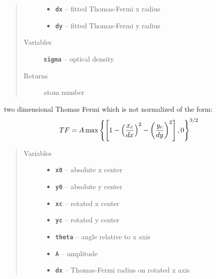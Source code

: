 \documentclass[letterpaper,10pt,english]{sphinxmanual}
\begin{document}
\begin{fulllineitems}
\begin{fulllineitems}
\begin{quote}
\begin{description}
\begin{itemize}
\item {} 
\textbf{\texttt{dx}} -- fitted Thomas-Fermi x radius

\item {} 
\textbf{\texttt{dy}} -- fitted Thomas-Fermi y radius

\end{itemize}

\item[{Variables}] \leavevmode
\textbf{\texttt{sigma}} -- optical density

\item[{Returns}] \leavevmode
atom number

\end{description}\end{quote}

\end{fulllineitems}


\begin{fulllineitems}
\label{fit_object:Fitobject.fit_object.TF_2D}
two dimensional Thomas Fermi which is not normalized of the form:
\begin{gather}
\begin{split}TF = A \max\left\{\left[1-\left(\frac{x_c}{dx}\right)^2-\left(\frac{y_c}{dy}\right)^2\right],0\right\}^{3/2}\end{split}\notag
\end{gather}\begin{quote}\begin{description}
\item[{Variables}] \leavevmode\begin{itemize}
\item {} 
\textbf{\texttt{x0}} -- absolute x center

\item {} 
\textbf{\texttt{y0}} -- absolute y center

\item {} 
\textbf{\texttt{xc}} -- rotated x center

\item {} 
\textbf{\texttt{yc}} -- rotated y center

\item {} 
\textbf{\texttt{theta}} -- angle relative to x axis

\item {} 
\textbf{\texttt{A}} -- amplitude

\item {} 
\textbf{\texttt{dx}} -- Thomas-Fermi radius on rotated x axis


\end{itemize}
\end{description}
\end{quote}
\end{fulllineitems}
\end{fulllineitems}
\end{document}
